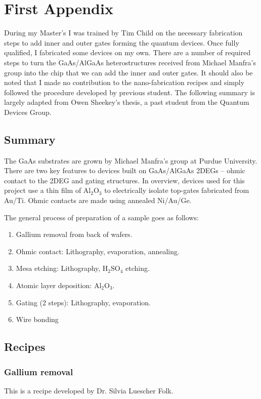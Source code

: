 \chapter{First Appendix}\label{cha:appendix1}


During my Master's I was trained by Tim Child on the necessary fabrication steps to add inner and outer gates forming the quantum devices. Once fully qualified, I fabricated some devices on my own. There are a number of required steps to turn the GaAs/AlGaAs heterostructures received from Michael Manfra's group into the chip that we can add the inner and outer gates. It should also be noted that I made no contribution to the nano-fabrication recipes and simply followed the procedure developed by previous student. The following summary is largely adapted from Owen Sheekey's thesis, a past student from the Quantum Devices Group. 

\section{Summary}
The GaAs substrates are grown by Michael Manfra’s group at Purdue University. There are two key features to devices built on GaAs/AlGaAs 2DEGs – ohmic contact to the 2DEG and gating structures. In overview, devices used for this project use a thin film of $\mathrm{Al_2O_3}$ to electrically isolate top-gates fabricated from Au/Ti. Ohmic contacts are made using annealed Ni/Au/Ge.

The general process of preparation of a sample goes as follows:

\begin{enumerate}
\item Gallium removal from back of wafers.
\item Ohmic contact: Lithography, evaporation, annealing.
\item Mesa etching: Lithography, $\mathrm{H_2SO_4}$ etching.
\item Atomic layer deposition: $\mathrm{Al_2O_3}$.
\item Gating (2 steps): Lithography, evaporation.
\item Wire bonding
\end{enumerate}

\section{Recipes}

\subsection{Gallium removal}
This is a recipe developed by Dr. Silvia Luescher Folk.


